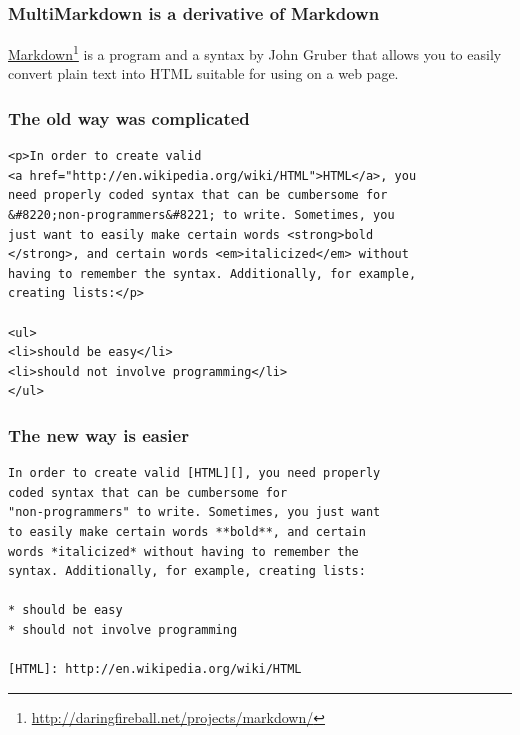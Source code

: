 
\def\mytitle{What is MultiMarkdown?}
\def\subtitle{And why should you care?}
\def\myauthor{Fletcher T. Penney}
\def\affiliation{http:/\slash fletcherpenney.net\slash multimarkdown\slash }
\def\copyright{2009-2011 Fletcher T. Penney.  \\
This work is licensed under a Creative Commons License.  \\
http:/\slash creativecommons.org\slash licenses\slash by-sa\slash 2.5\slash }
\def\latexmode{beamer}
\def\bibliostyle{fletcher}
\def\theme{keynote-gradient}

\begin{frame}

\frametitle{MultiMarkdown is a derivative of Markdown}
\label{multimarkdownisaderivativeofmarkdown}

\href{http://daringfireball.net/projects/markdown/}{Markdown}\footnote{\href{http://daringfireball.net/projects/markdown/}{http:/\slash daringfireball.net\slash projects\slash markdown\slash }} is a program and a
syntax by John Gruber that allows you to easily convert plain text into HTML
suitable for using on a web page.

\end{frame}

\begin{frame}[fragile]

\frametitle{The old way was complicated}
\label{theoldwaywascomplicated}

\begin{verbatim}
<p>In order to create valid 
<a href="http://en.wikipedia.org/wiki/HTML">HTML</a>, you 
need properly coded syntax that can be cumbersome for 
&#8220;non-programmers&#8221; to write. Sometimes, you
just want to easily make certain words <strong>bold
</strong>, and certain words <em>italicized</em> without
having to remember the syntax. Additionally, for example,
creating lists:</p>

<ul>
<li>should be easy</li>
<li>should not involve programming</li>
</ul>
\end{verbatim}


\end{frame}

\begin{frame}[fragile]

\frametitle{The new way is easier}
\label{thenewwayiseasier}

\begin{verbatim}
In order to create valid [HTML][], you need properly
coded syntax that can be cumbersome for 
"non-programmers" to write. Sometimes, you just want
to easily make certain words **bold**, and certain 
words *italicized* without having to remember the 
syntax. Additionally, for example, creating lists:

* should be easy
* should not involve programming

[HTML]: http://en.wikipedia.org/wiki/HTML
\end{verbatim}


\end{frame}

